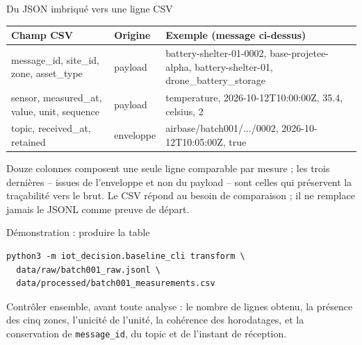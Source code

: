 \documentclass[aspectratio=169]{beamer}
\begin{document}
\begin{frame}{Du JSON imbriqué vers une ligne CSV}
  \scriptsize
  \begin{center}
  \begin{tabular}{@{}p{}p{}p{}@{}}
    \toprule
    Champ CSV & Origine & Exemple (message ci-dessus) \\
    \midrule
    message\_id, site\_id, zone, asset\_type & payload & battery-shelter-01-0002, base-projetee-alpha, battery-shelter-01, drone\_battery\_storage \\[2pt]
    sensor, measured\_at, value, unit, sequence & payload & temperature, 2026-10-12T10:00:00Z, 35.4, celsius, 2 \\[2pt]
    topic, received\_at, retained & enveloppe & airbase/batch001/.../0002, 2026-10-12T10:05:00Z, true \\
    \bottomrule
  \end{tabular}
  \end{center}
  \normalsize
  \alert{Douze colonnes composent une seule ligne comparable par mesure ; les trois dernières -- issues de l'enveloppe et non du payload -- sont celles qui préservent la traçabilité vers le brut. Le CSV répond au besoin de comparaison ; il ne remplace jamais le JSONL comme preuve de départ.}
\end{frame}

\begin{frame}[fragile]{Démonstration : produire la table}
  \scriptsize
  \begin{verbatim}
python3 -m iot_decision.baseline_cli transform \
  data/raw/batch001_raw.jsonl \
  data/processed/batch001_measurements.csv
  \end{verbatim}
  \normalsize
  Contrôler ensemble, avant toute analyse : le nombre de lignes obtenu, la présence des cinq zones, l'unicité de l'unité, la cohérence des horodatages, et la conservation de \texttt{message\_id}, du topic et de l'instant de réception.
\end{frame}
\end{document}
